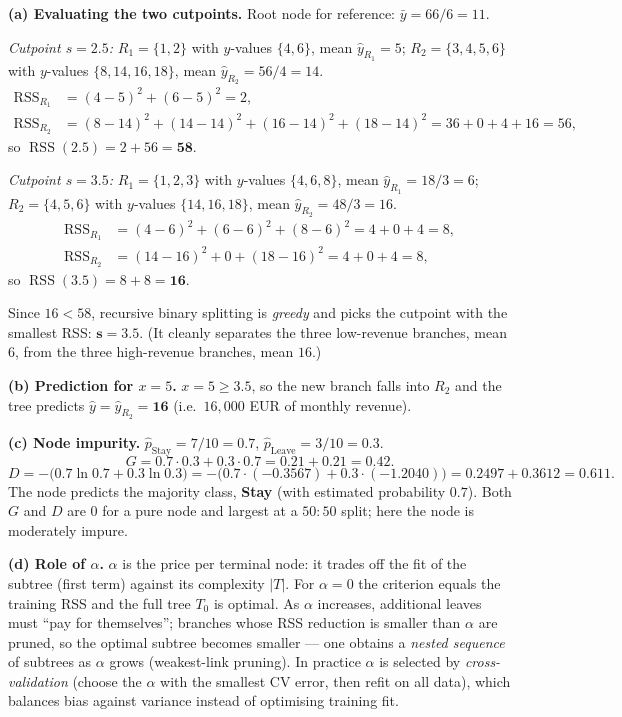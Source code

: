 \documentclass[11pt,a4paper]{article}
\begin{document}
\ifdefined\withsolutions
\begin{solutionbox}
\textbf{(a) Evaluating the two cutpoints.}
Root node for reference: $\bar{y}=66/6=11$.

\emph{Cutpoint $s=2.5$:} $R_1=\{1,2\}$ with $y$-values $\{4,6\}$, mean $\hat{y}_{R_1}=5$;
$R_2=\{3,4,5,6\}$ with $y$-values $\{8,14,16,18\}$, mean $\hat{y}_{R_2}=56/4=14$.
\[
\begin{aligned}
  \operatorname{RSS}_{R_1}&=(4-5)^2+(6-5)^2=2,\\
  \operatorname{RSS}_{R_2}&=(8-14)^2+(14-14)^2+(16-14)^2+(18-14)^2=36+0+4+16=56,
\end{aligned}
\]
so $\operatorname{RSS}(2.5)=2+56=\mathbf{58}$.

\emph{Cutpoint $s=3.5$:} $R_1=\{1,2,3\}$ with $y$-values $\{4,6,8\}$, mean
$\hat{y}_{R_1}=18/3=6$; $R_2=\{4,5,6\}$ with $y$-values $\{14,16,18\}$, mean
$\hat{y}_{R_2}=48/3=16$.
\[
\begin{aligned}
  \operatorname{RSS}_{R_1}&=(4-6)^2+(6-6)^2+(8-6)^2=4+0+4=8,\\
  \operatorname{RSS}_{R_2}&=(14-16)^2+0+(18-16)^2=4+0+4=8,
\end{aligned}
\]
so $\operatorname{RSS}(3.5)=8+8=\mathbf{16}$.

Since $16<58$, recursive binary splitting is \emph{greedy} and picks the cutpoint with the
smallest RSS: $\mathbf{s=3.5}$. (It cleanly separates the three low-revenue branches, mean $6$,
from the three high-revenue branches, mean $16$.)

\medskip
\textbf{(b) Prediction for $x=5$.}
$x=5\ge 3.5$, so the new branch falls into $R_2$ and the tree predicts
$\hat{y}=\hat{y}_{R_2}=\mathbf{16}$ (i.e.\ $16{,}000$ EUR of monthly revenue).

\medskip
\textbf{(c) Node impurity.}
$\hat{p}_{\text{Stay}}=7/10=0.7$, $\hat{p}_{\text{Leave}}=3/10=0.3$.
\[
  G=0.7\cdot 0.3+0.3\cdot 0.7=0.21+0.21=\mathbf{0.42}.
\]
\[
  D=-\bigl(0.7\ln 0.7+0.3\ln 0.3\bigr)
   =-\bigl(0.7\cdot(-0.3567)+0.3\cdot(-1.2040)\bigr)
   =0.2497+0.3612=\mathbf{0.611}.
\]
The node predicts the majority class, \textbf{Stay} (with estimated probability $0.7$).
Both $G$ and $D$ are $0$ for a pure node and largest at a $50{:}50$ split; here the node is
moderately impure.

\medskip
\textbf{(d) Role of $\alpha$.}
$\alpha$ is the price per terminal node: it trades off the fit of the subtree (first term)
against its complexity $|T|$.
For $\alpha=0$ the criterion equals the training RSS and the full tree $T_0$ is optimal.
As $\alpha$ increases, additional leaves must ``pay for themselves''; branches whose RSS
reduction is smaller than $\alpha$ are pruned, so the optimal subtree becomes smaller ---
one obtains a \emph{nested sequence} of subtrees as $\alpha$ grows (weakest-link pruning).
In practice $\alpha$ is selected by \emph{cross-validation} (choose the $\alpha$ with the
smallest CV error, then refit on all data), which balances bias against variance instead of
optimising training fit.
\end{solutionbox}
\fi
\end{document}
